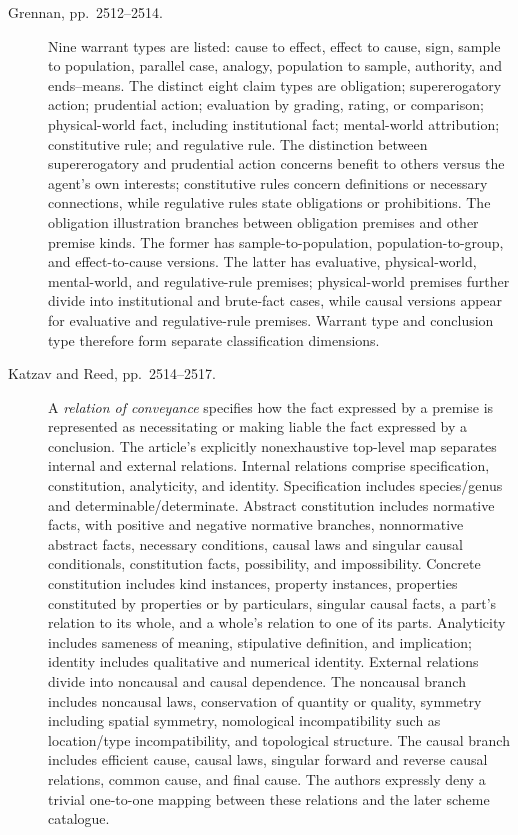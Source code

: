 \begin{description}
\item[Grennan, pp.~2512--2514.]
Nine warrant types are listed: cause to effect, effect to cause,
sign, sample to population, parallel case, analogy, population to
sample, authority, and ends--means.
The distinct eight claim types are obligation; supererogatory
action; prudential action; evaluation by grading, rating, or comparison;
physical-world fact, including institutional fact; mental-world
attribution; constitutive rule; and regulative rule.
The distinction between supererogatory and prudential action concerns
benefit to others versus the agent's own interests; constitutive
rules concern definitions or necessary connections, while regulative
rules state obligations or prohibitions.
The obligation illustration branches between obligation premises
and other premise kinds. The former has sample-to-population,
population-to-group, and effect-to-cause versions.
The latter has evaluative, physical-world, mental-world, and
regulative-rule premises; physical-world premises further divide
into institutional and brute-fact cases, while causal versions
appear for evaluative and regulative-rule premises.
Warrant type and conclusion type therefore form separate
classification dimensions.

\item[Katzav and Reed, pp.~2514--2517.]
A \emph{relation of conveyance} specifies how the fact expressed
by a premise is represented as necessitating or making liable
the fact expressed by a conclusion. The article's explicitly
nonexhaustive top-level map separates internal and external relations.
Internal relations comprise specification, constitution,
analyticity, and identity.
Specification includes species/genus and determinable/determinate.
Abstract constitution includes normative facts, with positive
and negative normative branches, nonnormative abstract facts,
necessary conditions, causal laws and singular causal conditionals,
constitution facts, possibility, and impossibility.
Concrete constitution includes kind instances, property instances,
properties constituted by properties or by particulars, singular
causal facts, a part's relation to its whole, and a whole's relation
to one of its parts.
Analyticity includes sameness of meaning, stipulative definition,
and implication; identity includes qualitative and numerical identity.
External relations divide into noncausal and causal dependence.
The noncausal branch includes noncausal laws, conservation of
quantity or quality, symmetry including spatial symmetry,
nomological incompatibility such as location/type
incompatibility, and topological structure.
The causal branch includes efficient cause, causal laws,
singular forward and reverse causal relations, common cause,
and final cause. The authors expressly deny a trivial one-to-one
mapping between these relations and the later scheme catalogue.


\end{description}
